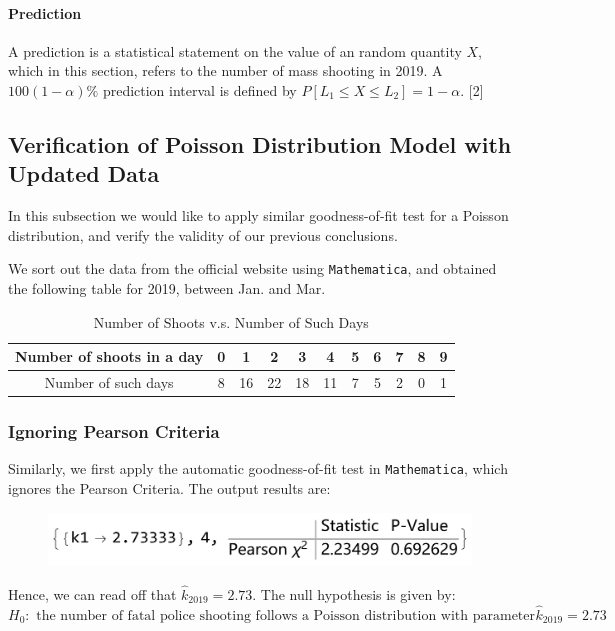\documentclass[a4paper]{article}
\begin{document}
\paragraph{Prediction} A prediction is a statistical statement on the value of an random quantity $X$, which in this section, refers to the number of mass shooting in 2019. A $100(1-\alpha)\%$ prediction interval is defined by $P[L_1 \leq X \leq L_2] = 1-\alpha$. [2]
\subsection{Verification of Poisson Distribution Model with Updated Data}
In this subsection we would like to apply similar goodness-of-fit test for a Poisson distribution, and verify the validity of our previous conclusions.

We sort out the data from the official website using \texttt{Mathematica}, and obtained the following table for 2019, between Jan. and Mar.
\begin{table}[!htbp]
  \centering
    \begin{tabular}{|c|c|c|c|c|c|c|c|c|c|c|}
    \hline
    Number of shoots in a day & 0     & 1     & 2     & 3     & 4     & 5     & 6     & 7     & 8     & 9 \\
    \hline
    Number of such days & 8     & 16    & 22    & 18    & 11    & 7     & 5     & 2     & 0     & 1 \\
    \hline
    \end{tabular}%
    \caption{Number of Shoots v.s. Number of Such Days}
\end{table}%

\subsubsection{Ignoring Pearson Criteria}
Similarly, we first apply the automatic goodness-of-fit test in \texttt{Mathematica}, which ignores the Pearson Criteria. The output results are:

\begin{figure}[!htbp]
\centering
\includegraphics[width=0.6\linewidth]{poissonfit2.png}
\end{figure}

Hence, we can read off that $\widehat{k}_{2019}=2.73$. The null hypothesis is given by:
$$H_0:\text{ the number of fatal police shooting follows a Poisson distribution with parameter }\widehat{k}_{2019}=2.73$$
\end{document}
